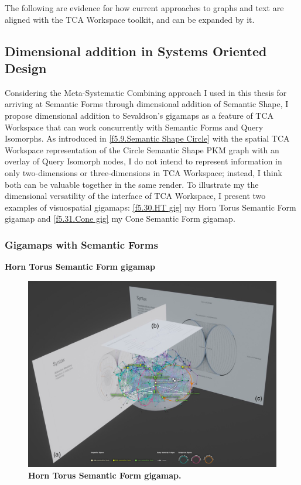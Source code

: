 The following are evidence for how current approaches to graphs and text are aligned with the TCA Workspace toolkit, and can be expanded by it. 

\subsection{Dimensional addition in Systems Oriented Design}
Considering the Meta-Systematic Combining approach I used in this thesis for arriving at Semantic Forms through dimensional addition of Semantic Shape, I propose dimensional addition to Sevaldson’s gigamaps \citep{sevaldson_giga-mapping_2011,sevaldson_designing_2022} as a feature of TCA Workspace that can work concurrently with Semantic Forms and Query Isomorphs. As introduced in \autoref{f5.9.Semantic Shape Circle} with the spatial TCA Workspace representation of the Circle Semantic Shape PKM graph with an overlay of Query Isomorph nodes, I do not intend to represent information in only two-dimensions or three-dimensions in TCA Workspace; instead, I think both can be valuable together in the same render. To illustrate my the dimensional versatility of the interface of TCA Workspace, I present two examples of visuospatial gigamaps: \autoref{f5.30.HT gig} my Horn Torus Semantic Form gigamap and \autoref{f5.31.Cone gig} my Cone Semantic Form gigamap.
\clearpage

\subsubsection{Gigamaps with Semantic Forms}
\FloatBarrier  
\noindent  \textbf{Horn Torus Semantic Form gigamap}
\\
\begin{figure}[h!]
    \centering
    \includegraphics[width=\textwidth]{figures/5.30.HT gig.png}
    \caption[Horn Torus Semantic Form gigamap]{\textbf{Horn Torus Semantic Form gigamap.}}
    \label{f5.30.HT gig}
\end{figure}
\FloatBarrier  

